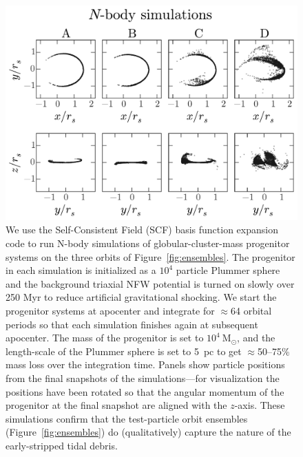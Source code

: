 \documentclass[letterpaper,12pt,preprint]{aastex}
\newcommand{\msun}{\ensuremath{\mathrm{M}_\odot}}
\newcommand{\chchchanges}[1]{{\color{red} {#1}}}
\begin{document}
\begin{figure}[p]
\begin{center}
\includegraphics[width=\textwidth]{figures/nbody.pdf}
\caption{ We use the Self-Consistent Field (SCF) basis function expansion code \citep{hernquist92} to run N-body simulations of globular-cluster-mass progenitor systems on the three orbits of Figure~\ref{fig:ensembles}. The progenitor in each simulation is initialized as a $10^4$ particle Plummer sphere and the background triaxial NFW potential is turned on slowly over 250 Myr to reduce artificial gravitational shocking. We start the progenitor systems at apocenter and \chchchanges{integrate} for $\approx$64 orbital periods so that each simulation finishes again at subsequent apocenter. The mass of the progenitor is set to $10^4~\msun$, and the length-scale of the Plummer sphere is set to 5~pc to get $\approx$50--75\% mass loss over the integration time. Panels show particle positions from the final snapshots of the simulations---for visualization the positions have been rotated so that the angular momentum of the progenitor at the final snapshot are aligned with the $z$-axis. These simulations confirm that the test-particle orbit ensembles (Figure~\ref{fig:ensembles}) do (qualitatively) capture the nature of the early-stripped tidal debris. } 
\label{fig:nbodysims}
\end{center}
\end{figure}
\end{document}
